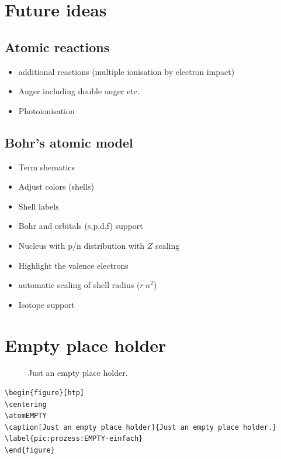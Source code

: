 \documentclass[
	a4paper,
	parskip=half,
    pagesize=auto,      		%
    listof=totoc,   		%
    bibliography=totoc,
	11pt
]{scrartcl}
\begin{document}
\section{Future ideas}

\subsection{Atomic reactions}

\begin{itemize}
	\item additional reactions (multiple ionisation by electron impact)
	\item Auger including double auger etc.
	\item Photoionisation
\end{itemize}

\subsection{Bohr's atomic model}

\begin{itemize}
	\item Term shematics
	\item Adjust colors (shells)
	\item Shell labels
	\item Bohr and orbitals (s,p,d,f) support
	\item Nucleus with p/n distribution with $Z$ scaling
	\item Highlight the valence electrons
	\item automatic scaling of shell radius ($r ~ n^2$)
	\item Isotope support 
\end{itemize}



\section{Empty place holder}
 
\begin{figure}[htp]
\centering
\atomEMPTY
\caption[Just an empty place holder]{Just an empty place holder.}
\label{pic:prozess:EMPTY-einfach}
\end{figure}

\begin{lstlisting}
\begin{figure}[htp]
\centering
\atomEMPTY
\caption[Just an empty place holder]{Just an empty place holder.}
\label{pic:prozess:EMPTY-einfach}
\end{figure}
\end{lstlisting}
\end{document}

